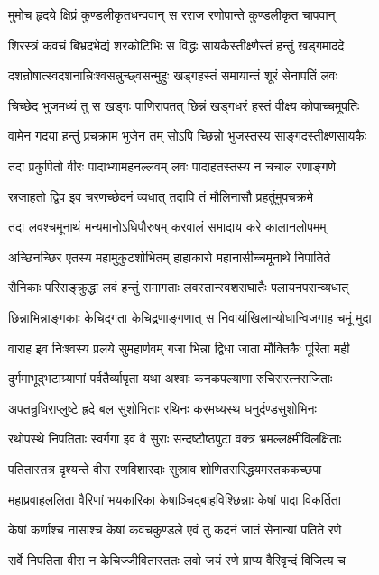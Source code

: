 \twolineshloka
{मुमोच हृदये क्षिप्रं कुण्डलीकृतधन्ववान्}
{स रराज रणोपान्ते कुण्डलीकृत चापवान्}%

\twolineshloka
{शिरस्त्रं कवचं बिभ्रदभेद्यं शरकोटिभिः}
{स विद्धः सायकैस्तीक्ष्णैस्तं हन्तुं खड्गमाददे}%

\twolineshloka
{दशन्रोषात्स्वदशनान्निःश्वसन्नुच्छ्वसन्मुहुः}
{खड्गहस्तं समायान्तं शूरं सेनापतिं लवः}%

\twolineshloka
{चिच्छेद भुजमध्यं तु स खड्गः पाणिरापतत्}
{छिन्नं खड्गधरं हस्तं वीक्ष्य कोपाच्चमूपतिः}%

\twolineshloka
{वामेन गदया हन्तुं प्रचक्राम भुजेन तम्}
{सोऽपि च्छिन्नो भुजस्तस्य साङ्गदस्तीक्ष्णसायकैः}%

\twolineshloka
{तदा प्रकुपितो वीरः पादाभ्यामहनल्लवम्}
{लवः पादाहतस्तस्य न चचाल रणाङ्गणे}%

\twolineshloka
{स्रजाहतो द्विप इव चरणच्छेदनं व्यधात्}
{तदापि तं मौलिनासौ प्रहर्तुमुपचक्रमे}%

\twolineshloka
{तदा लवश्चमूनाथं मन्यमानोऽधिपौरुषम्}
{करवालं समादाय करे कालानलोपमम्}%

\twolineshloka
{अच्छिनच्छिर एतस्य महामुकुटशोभितम्}
{हाहाकारो महानासीच्चमूनाथे निपातिते}%

\twolineshloka
{सैनिकाः परिसङ्क्रुद्धा लवं हन्तुं समागताः}
{लवस्तान्स्वशराघातैः पलायनपरान्व्यधात्}%

\twolineshloka
{छिन्नाभिन्नाङ्गकाः केचिद्गता केचिद्रणाङ्गणात्}
{स निवार्याखिलान्योधान्विजगाह चमूं मुदा}%

\twolineshloka
{वाराह इव निःश्वस्य प्रलये सुमहार्णवम्}
{गजा भिन्ना द्विधा जाता मौक्तिकैः पूरिता मही}%

\twolineshloka
{दुर्गमाभूद्भटाग्र्याणां पर्वतैर्व्यापृता यथा}
{अश्वाः कनकपल्याणा रुचिरारत्नराजिताः}%

\twolineshloka
{अपतन्रुधिराप्लुष्टे ह्रदे बल सुशोभिताः}
{रथिनः करमध्यस्थ धनुर्दण्डसुशोभिनः}%

\twolineshloka
{रथोपस्थे निपतिताः स्वर्गगा इव वै सुराः}
{सन्दष्टौष्ठपुटा वक्त्र भ्रमल्लक्ष्मीविलक्षिताः}%

\twolineshloka
{पतितास्तत्र दृश्यन्ते वीरा रणविशारदाः}
{सुस्राव शोणितसरिद्धयमस्तककच्छपा}%

\twolineshloka
{महाप्रवाहललिता वैरिणां भयकारिका}
{केषाञ्चिद्बाहविश्छिन्नाः केषां पादा विकर्तिता}%

\twolineshloka
{केषां कर्णाश्च नासाश्च केषां कवचकुण्डले}
{एवं तु कदनं जातं सेनान्यां पतिते रणे}%

\twolineshloka
{सर्वे निपतिता वीरा न केचिज्जीवितास्ततः}
{लवो जयं रणे प्राप्य वैरिवृन्दं विजित्य च}%

